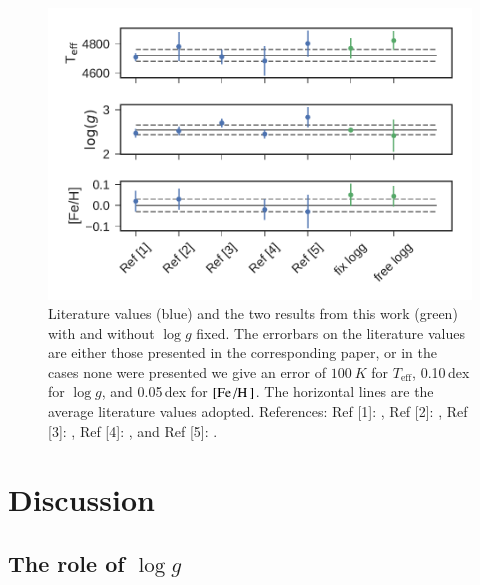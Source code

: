 \documentclass{aa}
\begin{document}
\begin{figure}[htpb!!]
    \centering
    \includegraphics[width=1.0\linewidth]{figures/10LeoParams.pdf}
    \caption{Literature values (blue) and the two results from this work (green)
             with and without $\log g$ fixed. The errorbars on the literature
             values are either those presented in the corresponding paper, or in
             the cases none were presented we give an error of $\SI{100}{K}$ for
             $T_\mathrm{eff}$, 0.10\,dex for $\log g$, and 0.05\,dex for
             $[\ion{Fe}/\ion{H}]$. The horizontal lines are the average
             literature values adopted.
             References:
             Ref [1]: \citet{Luck2015},
             Ref [2]: \citet{Park2013},
             Ref [3]: \citet{Massarotti2008},
             Ref [4]: \citet{Soubiran2008}, and
             Ref [5]: \cite{daSilva2011}.}
    \label{fig:10leo}
\end{figure}



\section{Discussion}
\label{sec:discussion}

\subsection{The role of $\log g$}
\end{document}
